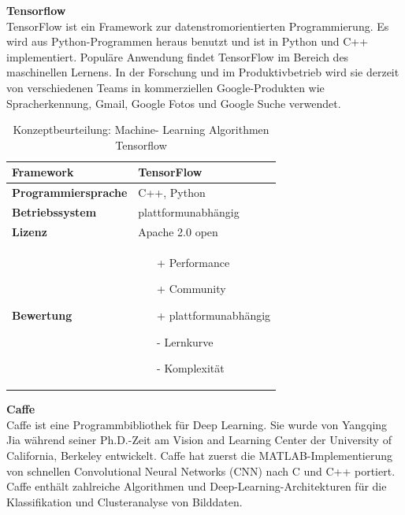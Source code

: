 \documentclass[../../../main.tex]{subfiles}
\begin{document}
        \textbf{Tensorflow}\\
        TensorFlow ist ein Framework zur datenstromorientierten Programmierung. Es wird aus Python-Programmen heraus benutzt und ist in Python und C++ implementiert. Populäre Anwendung findet TensorFlow im Bereich des maschinellen Lernens. In der Forschung und im Produktivbetrieb wird sie derzeit von verschiedenen Teams in kommerziellen Google-Produkten wie Spracherkennung, Gmail, Google Fotos und Google Suche verwendet.

        \begin{flushleft}
            \begin{table}[h]
            \begin{tabular}{ | l | p{11cm} |}
            \hline
            \textbf{Framework} & TensorFlow \\ \hline
            \textbf{Programmiersprache} & C++, Python \\ \hline
            \textbf{Betriebssystem} & plattformunabhängig \\ \hline
            \textbf{Lizenz} & Apache 2.0 open \\ \hline
            \textbf{Bewertung} &  \begin{itemize}
                                    \item[+] Performance
                                    \item[+] Community
                                    \item[+] plattformunabhängig 
                                    \item[-] Lernkurve
                                    \item[-] Komplexität 
                                  \end{itemize} \\ \hline
            \end{tabular}
            \caption{Konzeptbeurteilung: Machine- Learning Algorithmen Tensorflow}
            \label{tab:konzept_ML_Tensorflow}
            \end{table}
        \end{flushleft}
        \pagebreak

        \textbf{Caffe}\\
        Caffe ist eine Programmbibliothek für Deep Learning. Sie wurde von Yangqing Jia während seiner Ph.D.-Zeit am Vision and Learning Center der University of California, Berkeley entwickelt. Caffe hat zuerst die MATLAB-Implementierung von schnellen Convolutional Neural Networks (CNN) nach C und C++ portiert. Caffe enthält zahlreiche Algorithmen und Deep-Learning-Architekturen für die Klassifikation und Clusteranalyse von Bilddaten.
        
\end{document}

